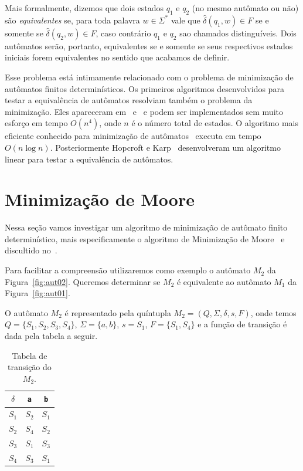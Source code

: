 \documentclass[
	12pt,				%
	openany,
	oneside,
	a4paper,			%
	english,			%
	brazil				%
	]{abntex2}
\begin{document}
  Mais formalmente, dizemos que dois estados $q_1$ e $q_2$ (no mesmo autômato ou não) são \emph{equivalentes} se, para toda palavra $w \in \Sigma^*$ vale que $\hat{\delta}(q_1, w) \in F$ se e somente se $\hat{\delta}(q_2, w) \in F$, caso contrário $q_1$ e $q_2$ sao  chamados distinguíveis. Dois autômatos serão, portanto, equivalentes  se e somente se seus respectivos estados iniciais forem equivalentes  no sentido que acabamos de definir.



  Esse problema está intimamente relacionado com o problema de minimização de autômatos finitos determinísticos. Os primeiros algoritmos desenvolvidos para testar a equivalência de autômatos resolviam também o problema da minimização. Eles apareceram em~\cite{huffman} e~\cite{moore} e podem ser implementados sem muito esforço em tempo $O(n^4)$, onde $n$ é o número total de estados. O algoritmo mais eficiente conhecido para minimização de autômatos~\cite{hopcroft} executa em tempo $O(n \log{}n)$. Posteriormente Hopcroft e Karp~\cite{hopcroft_karp} desenvolveram um algoritmo linear para testar a equivalência de autômatos.



\section{Minimização de Moore}

  Nessa seção vamos investigar um algoritmo de minimização de autômato finito determinístico, mais especificamente o algoritmo de Minimização de Moore~\cite{moore} e discultido no~\cite{ullman}.

  Para facilitar a compreensão utilizaremos como exemplo o autômato $M_2$ da Figura~\ref{fig:aut02}. Queremos determinar se $M_2$ é equivalente ao autômato $M_1$ da Figura~\ref{fig:aut01}.

  O autômato $M_2$ é representado pela quíntupla $M_2 = (Q, \Sigma, \delta, s, F)$, onde temos $Q = \{S_1, S_2, S_3, S_4\}$, $\Sigma = \{a, b\}$, $s = S_1$, $F = \{S_1, S_4\}$ e a função de transição é dada pela tabela a seguir.

  \begin{table}[H]
    \centering
    \begin{tabular}[H]{c|c c}
      $\delta$ & \textbf{\texttt{a}} & \textbf{\texttt{b}}\\
      \hline
      $S_1$    & $S_2$               & $S_1$              \\
      $S_2$    & $S_4$               & $S_2$              \\
      $S_3$    & $S_1$               & $S_3$              \\
      $S_4$    & $S_3$               & $S_1$              \\
    \end{tabular}
    \caption{Tabela de transição do $M_2$.}
    \vspace{-0.5cm}
  \end{table}
\end{document}
